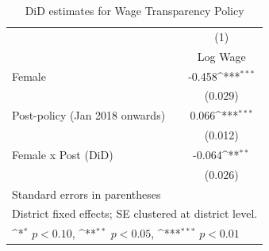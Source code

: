\begin{table}[htbp]\centering
\def\sym#1{\ifmmode^{#1}\else\(^{#1}\)\fi}
\caption{DiD estimates for Wage Transparency Policy}
\begin{tabular}{l*{1}{c}}
\toprule
                    &\multicolumn{1}{c}{(1)}\\
                    &\multicolumn{1}{c}{Log Wage}\\
\midrule
Female              &      -0.458\sym{***}\\
                    &     (0.029)         \\
\addlinespace
Post-policy (Jan 2018 onwards)&       0.066\sym{***}\\
                    &     (0.012)         \\
\addlinespace
Female x Post (DiD) &      -0.064\sym{**} \\
                    &     (0.026)         \\
\bottomrule
\multicolumn{2}{l}{\footnotesize Standard errors in parentheses}\\
\multicolumn{2}{l}{\footnotesize \parbox{0.9\linewidth}{District fixed effects; SE clustered at district level.}}\\
\multicolumn{2}{l}{\footnotesize \sym{*} \(p<0.10\), \sym{**} \(p<0.05\), \sym{***} \(p<0.01\)}\\
\end{tabular}
\end{table}

